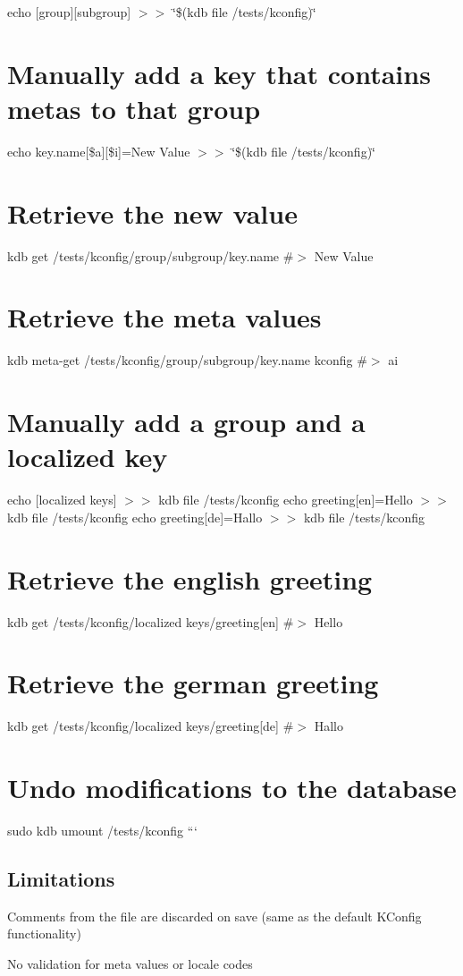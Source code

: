 echo \textquotesingle{}\mbox{[}group\mbox{]}\mbox{[}subgroup\mbox{]}\textquotesingle{} $>$$>$ \char`\"{}\$(kdb file /tests/kconfig)\char`\"{}\hypertarget{autotoc_md317_autotoc_md325}{}\section{Manually add a key that contains metas to that group}\label{autotoc_md317_autotoc_md325}
echo \textquotesingle{}key.\+name\mbox{[}\$a\mbox{]}\mbox{[}\$i\mbox{]}=New Value\textquotesingle{} $>$$>$ \char`\"{}\$(kdb file /tests/kconfig)\char`\"{}\hypertarget{autotoc_md317_autotoc_md326}{}\section{Retrieve the new value}\label{autotoc_md317_autotoc_md326}
kdb get /tests/kconfig/group/subgroup/key.name \#$>$ New Value\hypertarget{autotoc_md317_autotoc_md327}{}\section{Retrieve the meta values}\label{autotoc_md317_autotoc_md327}
kdb meta-\/get /tests/kconfig/group/subgroup/key.name kconfig \#$>$ ai\hypertarget{autotoc_md317_autotoc_md328}{}\section{Manually add a group and a localized key}\label{autotoc_md317_autotoc_md328}
echo \textquotesingle{}\mbox{[}localized keys\mbox{]}\textquotesingle{} $>$$>$ {\ttfamily kdb file /tests/kconfig} echo \textquotesingle{}greeting\mbox{[}en\mbox{]}=Hello\textquotesingle{} $>$$>$ {\ttfamily kdb file /tests/kconfig} echo \textquotesingle{}greeting\mbox{[}de\mbox{]}=Hallo\textquotesingle{} $>$$>$ {\ttfamily kdb file /tests/kconfig}\hypertarget{autotoc_md317_autotoc_md329}{}\section{Retrieve the english greeting}\label{autotoc_md317_autotoc_md329}
kdb get \textquotesingle{}/tests/kconfig/localized keys/greeting\mbox{[}en\mbox{]}\textquotesingle{} \#$>$ Hello\hypertarget{autotoc_md317_autotoc_md330}{}\section{Retrieve the german greeting}\label{autotoc_md317_autotoc_md330}
kdb get \textquotesingle{}/tests/kconfig/localized keys/greeting\mbox{[}de\mbox{]}\textquotesingle{} \#$>$ Hallo\hypertarget{autotoc_md317_autotoc_md331}{}\section{Undo modifications to the database}\label{autotoc_md317_autotoc_md331}
sudo kdb umount /tests/kconfig ```\hypertarget{autotoc_md317_autotoc_md332}{}\subsection{Limitations}\label{autotoc_md317_autotoc_md332}

\begin{DoxyItemize}
\item Comments from the file are discarded on save (same as the default K\+Config functionality)
\item No validation for meta values or locale codes 
\end{DoxyItemize}